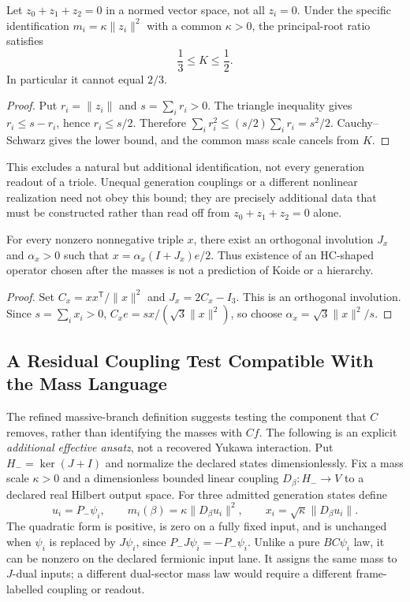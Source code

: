 \begin{proposition}
\label{v480:hc-mass-triole-bound}
Let $z_0+z_1+z_2=0$ in a normed vector space, not all $z_i=0$.
Under the specific identification $m_i=\kappa\|z_i\|^2$ with a
common $\kappa>0$, the principal-root ratio satisfies
\[
 \frac13\leq K\leq\frac12.
\]
In particular it cannot equal $2/3$.
\end{proposition}
\begin{proof}
Put $r_i=\|z_i\|$ and $s=\sum_i r_i>0$. The triangle inequality
gives $r_i\leq s-r_i$, hence $r_i\leq s/2$. Therefore
$\sum_i r_i^2\leq(s/2)\sum_i r_i=s^2/2$.
Cauchy--Schwarz gives the lower bound, and the common mass scale
cancels from $K$.
\end{proof}

This excludes a natural but additional identification, not every
generation readout of a triole. Unequal generation couplings or a
different nonlinear realization need not obey this bound; they are
precisely additional data that must be constructed rather than read
off from $z_0+z_1+z_2=0$ alone.

\begin{proposition}
\label{v480:hc-mass-fit-freedom}
For every nonzero nonnegative triple $x$, there exist an orthogonal
involution $J_x$ and $\alpha_x>0$ such that
$x=\alpha_x(I+J_x)e/2$. Thus existence of an HC-shaped operator
chosen after the masses is not a prediction of Koide or a hierarchy.
\end{proposition}
\begin{proof}
Set $C_x=xx^{\mathsf T}/\|x\|^2$ and $J_x=2C_x-I_3$.
This is an orthogonal involution. Since $s=\sum_i x_i>0$,
$C_xe=sx/(\sqrt3\|x\|^2)$, so choose
$\alpha_x=\sqrt3\|x\|^2/s$.
\end{proof}

\subsection{A Residual Coupling Test Compatible With the Mass Language}
\label{v480:hc-mass-residual-test}

The refined massive-branch definition suggests testing the component
that $C$ removes, rather than identifying the masses with $Cf$.
The following is an explicit \emph{additional effective ansatz}, not
a recovered Yukawa interaction. Put $H_-=\ker(J+I)$ and normalize
the declared states dimensionlessly. Fix a mass scale $\kappa>0$ and a dimensionless
bounded linear coupling $D_\beta:H_-\to V$ to a declared real
Hilbert output space. For three admitted generation states define
\[
 u_i=P_-\psi_i,\qquad
 m_i(\beta)=\kappa\|D_\beta u_i\|^2,\qquad
 x_i=\sqrt\kappa\|D_\beta u_i\|.
\]
The quadratic form is positive, is zero on a fully fixed input,
and is unchanged when $\psi_i$ is replaced by $J\psi_i$, since
$P_-J\psi_i=-P_-\psi_i$. Unlike a pure $BC\psi_i$ law, it can
be nonzero on the declared fermionic input lane. It assigns the
same mass to $J$-dual inputs; a different dual-sector mass law
would require a different frame-labelled coupling or readout.

